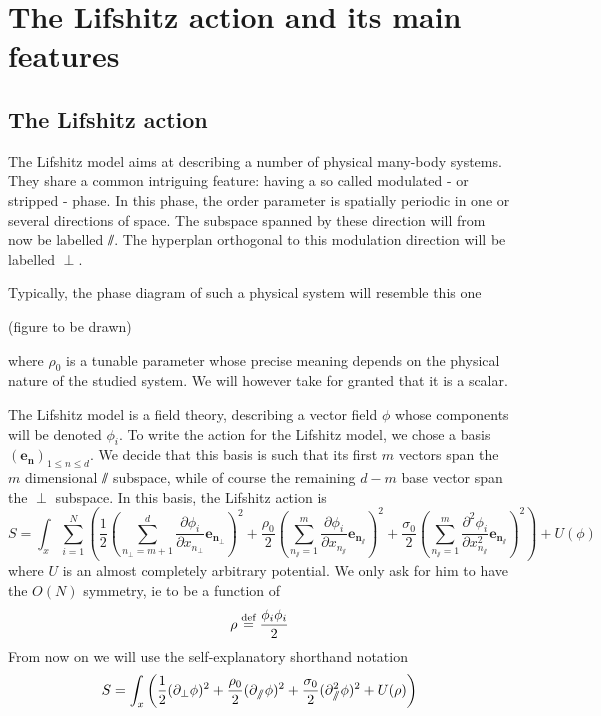 


\section{The Lifshitz action and its main features}

\subsection{The Lifshitz action}

The Lifshitz model aims at describing a number of physical many-body systems. They share a common intriguing feature: having a so called modulated - or stripped - phase. In this phase, the order parameter is spatially periodic in one or several directions of space. The subspace spanned by these direction will from now be labelled $\sslash$. The hyperplan orthogonal to this modulation direction will be labelled $\perp$.

Typically, the phase diagram of such a physical system will resemble this one

(figure to be drawn)

where $\rho_0$ is a tunable parameter whose precise meaning depends on the physical nature of the studied system. We will however take for granted that it is a scalar.

The Lifshitz model is a field theory, describing a vector field $\phi$ whose components will be denoted $\phi_i$. To write the action for the Lifshitz model, we chose a basis $(\mathbf{e_n})_{1 \leq n \leq d}$. We decide that this basis is such that its first $m$ vectors span the $m$ dimensional $\sslash$ subspace, while of course the remaining $d-m$ base vector span the $\perp$ subspace. In this basis, the Lifshitz action is
\begin{equation}
S = \int_x \sum_{i=1}^N \left( \frac{1}{2} \left(\sum_{n_\perp=m+1}^{d}\frac{\partial \phi_i}{\partial x_{n_\perp}} \mathbf{e_{n_\perp}}\right)^2 + \frac{\rho_0}{2} \left(\sum_{n_\sslash=1}^{m}\frac{\partial \phi_i}{\partial x_{n_\sslash}} \mathbf{e_{n_\sslash}}\right)^2 + \frac{\sigma_0}{2} \left(\sum_{n_\sslash=1}^{m} \frac{\partial^2 \phi_i}{\partial x_{n_\sslash}^2} \mathbf{e_{n_\sslash}}\right)^2 \right) + U(\phi)
\end{equation}
where $U$ is an almost completely arbitrary potential. We only ask for him to have the $O(N)$ symmetry, ie to be a function of
\begin{equation}
\rho  \overset{\text{def}}{=}  \frac{\phi_i \phi_i}{2}
\end{equation}
From now on we will use the self-explanatory shorthand notation
\begin{equation}
S = \int_x \left( \frac{1}{2}(\partial_{\perp} \phi)^2 + \frac{\rho_0}{2}(\partial_{\sslash} \phi)^2 + \frac{\sigma_0}{2} (\partial_{\sslash}^2 \phi)^2 + U(\rho) \right)
\end{equation}

